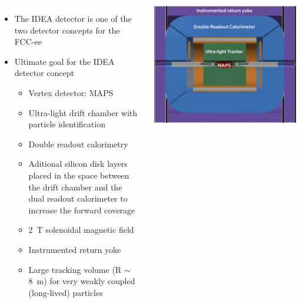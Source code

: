 \documentclass[final,xcolor={dvipsnames,svgnames,x11names,table}]{beamer}
\begin{document}
\begin{frame}
\begin{textblock}{83}
\begin{tcolorbox}[title=The IDEA detector concept for FCC-ee]
  \begin{columns}
      \begin{itemize}
        \item The IDEA detector is one of the two detector concepts for the FCC-ee \vspace{0.5cm}
        \item Ultimate goal for the IDEA detector concept \vspace{0.5cm}
          \begin{itemize}
            \item Vertex detector: MAPS \vspace{0.2cm}
            \item Ultra-light drift chamber with particle identification \vspace{0.2cm}
            \item Double readout calorimetry \vspace{0.2cm}
            \item Aditional silicon disk layers placed in the space between the drift chamber and the dual readout calorimeter to increase the forward coverage \vspace{0.2cm}
            \item 2~T solenoidal magnetic field \vspace{0.2cm}
            \item Instrumented return yoke \vspace{0.2cm}
            \item Large tracking volume (R $\sim$ 8~m) for very weakly coupled (long-lived) particles
          \end{itemize}
      \end{itemize}


      \centering
      \includegraphics[width=\textwidth]{../figures/FCCeeIDEAConcept}


\end{columns}
\end{tcolorbox}
\end{textblock}
\end{frame}
\end{document}
